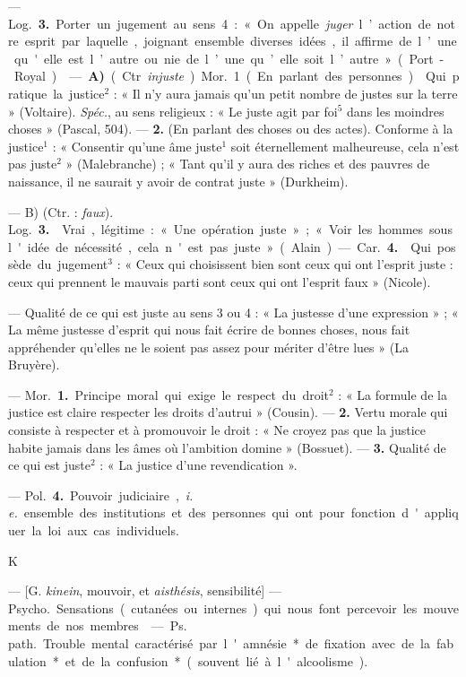 \begin{itemize}[leftmargin=1cm, label=, itemsep=1pt]
— \si{Log.} {\bf 3.} Porter un jugement au sens 4 : « On appelle {\it juger}
l’action de notre esprit par laquelle, joignant ensemble diverses idées, il
affirme de l’une qu'elle est l’autre ou nie de l’une qu’elle soit
l’autre » (Port-Royal).

 — {\bf A)} (Ctr. {\it injuste}). \si{Mor.} 1. (En parlant des
personnes).  Qui pratique la justice$^2$ : « Il n’y aura jamais
qu’un petit nombre de justes sur la terre » (Voltaire). {\it Spéc.}, au sens
religieux : « Le juste agit par foi$^5$ dans les moindres choses » (Pascal,
504). — {\bf 2.} (En parlant des choses ou des actes). 
Conforme à la justice$^1$ : « Consentir qu’une âme juste$^1$ soit
éternellement malheureuse, cela n’est pas juste$^2$ » (Malebranche) ;
« Tant qu'il y aura des riches et des pauvres de naissance, il ne saurait y
avoir de contrat juste » (Durkheim).

— B) (Ctr. : {\it faux}). \si{Log.} {\bf 3.}  Vrai, légitime :
« Une opération juste » ; « Voir les hommes sous l'idée de nécessité, cela
n'est pas juste » (Alain). — \si{Car.} {\bf 4.}  Qui possède du
jugement$^3$ : « Ceux qui choisissent bien sont ceux qui ont l'esprit juste :
ceux qui prennent le mauvais parti sont ceux qui ont l'esprit faux » (Nicole).

 — Qualité de ce qui est juste au sens 3 ou 4 : « La justesse
d’une expression » ; « La même justesse d'esprit qui nous fait écrire de
bonnes choses, nous fait appréhender qu'elles ne le soient pas assez pour
mériter d’être lues » (La Bruyère).

 — \si{Mor.} {\bf 1.} Principe moral qui exige le respect du
droit$^2$ : « La formule de la justice est claire respecter les droits
d’autrui » (Cousin). — {\bf 2.} Vertu morale qui consiste à respecter et à
promouvoir le droit : « Ne croyez pas que la justice habite jamais dans les
âmes où l'ambition domine » (Bossuet). — {\bf 3.}  Qualité de
ce qui est juste$^2$ : « La justice d’une revendication ».

— \si{Pol.} {\bf 4.} Pouvoir judiciaire, {\it i. e.} ensemble des institutions
et des personnes qui ont pour fonction d'appliquer la loi aux cas individuels.

\begin{center}
K
\end{center}

 — [G. {\it kinein}, mouvoir, et
{\it aisthésis}, sensibilité] — \si{Psycho.} Sensations (cutanées ou internes)
qui nous font percevoir les mouvements de nos membres.

 — \si{Ps. path.} Trouble mental caractérisé par
l'amnésie* de fixation avec de la fabulation* et de la confusion* (souvent lié
à l'alcoolisme).

	\end{itemize}
